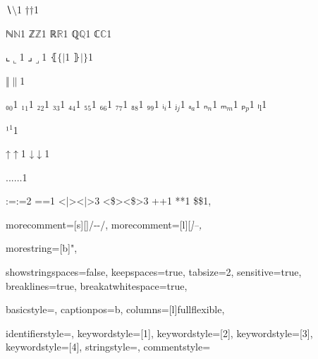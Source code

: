 {    {∖}{{\ensuremath{\setminus}}}1
    {†}{{\ensuremath{\dag}}}1

    {ℕ}{{\ensuremath{\mathbb{N}}}}1
    {ℤ}{{\ensuremath{\mathbb{Z}}}}1
    {ℝ}{{\ensuremath{\mathbb{R}}}}1
    {ℚ}{{\ensuremath{\mathbb{Q}}}}1
    {ℂ}{{\ensuremath{\mathbb{C}}}}1

    {⌞}{{\ensuremath{\llcorner}}}1
    {⌟}{{\ensuremath{\lrcorner}}}1
    {⦃}{{\ensuremath{\{\!|}}}1
    {⦄}{{\ensuremath{|\!\}}}}1

    {‖}{{\ensuremath{\|}}}1

    {₀}{{\ensuremath{_0}}}1
    {₁}{{\ensuremath{_1}}}1
    {₂}{{\ensuremath{_2}}}1
    {₃}{{\ensuremath{_3}}}1
    {₄}{{\ensuremath{_4}}}1
    {₅}{{\ensuremath{_5}}}1
    {₆}{{\ensuremath{_6}}}1
    {₇}{{\ensuremath{_7}}}1
    {₈}{{\ensuremath{_8}}}1
    {₉}{{\ensuremath{_9}}}1
    {ᵢ}{{\ensuremath{_i}}}1
    {ⱼ}{{\ensuremath{_j}}}1
    {ₐ}{{\ensuremath{_a}}}1
    {ₙ}{{\ensuremath{_n}}}1
    {ₘ}{{\ensuremath{_m}}}1
    {ₚ}{{\ensuremath{_p}}}1
    {ₗ}{{\textsubscript{l}}}1

    {¹}{{\ensuremath{^1}}}1

    {↑}{{\ensuremath{\uparrow}}}1
    {↓}{{\ensuremath{\downarrow}}}1

    {...}{{\ensuremath{\ldots}}}1

    {:=}{{\color{symbolcolor}:=}}2
    {=}{{\color{symbolcolor}=}}1
    {<|>}{{\color{symbolcolor}<|>}}3
    {<\$>}{{\color{symbolcolor}<\$>}}3
    {+}{{\color{symbolcolor}+}}1
    {*}{{\color{symbolcolor}*}}1
    {\$}{{\color{symbolcolor}\$}}1,

  morecomment=[s][\color{commentcolor}]{/-}{-/},
  morecomment=[l][\itshape\color{commentcolor}]{--},

  morestring=[b]",

  showstringspaces=false,
  keepspaces=true,
  tabsize=2,
  sensitive=true,
  breaklines=true,
  breakatwhitespace=true,

  basicstyle=\ttfamily\small,
  captionpos=b,
  columns=[l]fullflexible,

  identifierstyle={\ttfamily\color{black}},
  keywordstyle=[1]{\ttfamily\color{keywordcolor}},
  keywordstyle=[2]{\ttfamily\color{sortcolor}},
  keywordstyle=[3]{\ttfamily\color{tacticcolor}},
  keywordstyle=[4]{\ttfamily\color{attributecolor}},
  stringstyle=\ttfamily,
  commentstyle={\ttfamily\footnotesize}
}

